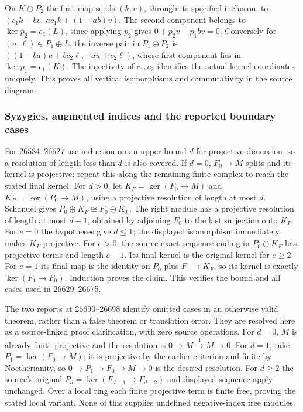 On \(K\oplus P_2\) the first map sends \((k,v)\), through its specified inclusion, to \((c_1k-bv,\ ac_1k+(1-ab)v)\). The second component belongs to \(\ker p_2=c_2(L)\), since applying \(p_2\) gives \(0+p_2v-p_1bv=0\). Conversely for \((u,\ell)\in P_1\oplus L\), the inverse pair in \(P_1\oplus P_2\) is \(((1-ba)u+bc_2\ell,-au+c_2\ell)\), whose first component lies in \(\ker p_1=c_1(K)\). The injectivity of \(c_1,c_2\) identifies the actual kernel coordinates uniquely. This proves all vertical isomorphisms and commutativity in the source diagram.

\subsubsection{Syzygies, augmented indices and the reported boundary cases}\label{syzygies-augmented-indices-and-the-reported-boundary-cases}

For 26584--26627 use induction on an upper bound \(d\) for projective dimension, so a resolution of length less than \(d\) is also covered. If \(d=0\), \(F_0\to M\) splits and its kernel is projective; repeat this along the remaining finite complex to reach the stated final kernel. For \(d>0\), let \(K_F=\ker(F_0\to M)\) and \(K_P=\ker(P_0\to M)\), using a projective resolution of length at most \(d\). Schanuel gives \(P_0\oplus K_F\cong F_0\oplus K_P\). The right module has a projective resolution of length at most \(d-1\), obtained by adjoining \(F_0\) to the last surjection onto \(K_P\). For \(e=0\) the hypotheses give \(d\le1\); the displayed isomorphism immediately makes \(K_F\) projective. For \(e>0\), the source exact sequence ending in \(P_0\oplus K_F\) has projective terms and length \(e-1\). Its final kernel is the original kernel for \(e\ge2\). For \(e=1\) its final map is the identity on \(P_0\) plus \(F_1\to K_F\), so its kernel is exactly \(\ker(F_1\to F_0)\). Induction proves the claim. This verifies the bound and all cases used in 26629--26675.

The two reports at 26690--26698 identify omitted cases in an otherwise valid theorem, rather than a false theorem or translation error. They are resolved here as a source-linked proof clarification, with zero source operations. For \(d=0\), \(M\) is already finite projective and the resolution is \(0\to M\xrightarrow{1}M\to0\). For \(d=1\), take \(P_1=\ker(F_0\to M)\); it is projective by the earlier criterion and finite by Noetherianity, so \(0\to P_1\to F_0\to M\to0\) is the desired resolution. For \(d\ge2\) the source's original \(P_d=\ker(F_{d-1}\to F_{d-2})\) and displayed sequence apply unchanged. Over a local ring each finite projective term is finite free, proving the stated local variant. None of this supplies undefined negative-index free modules.

